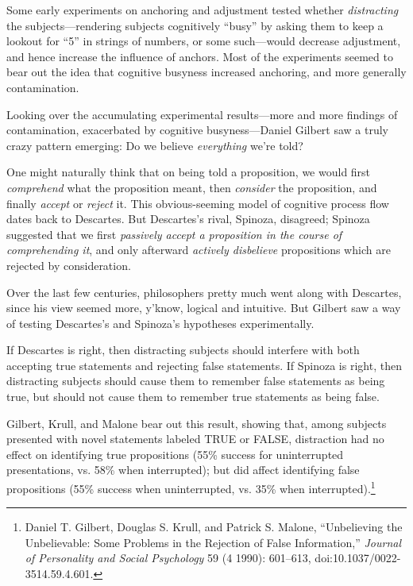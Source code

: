 \myendsectiontext


\bigskip


{
 Some early experiments on anchoring and adjustment tested whether
\textit{distracting} the subjects---rendering subjects cognitively
``busy'' by asking them to keep a
lookout for ``5'' in strings of
numbers, or some such---would decrease adjustment, and hence increase
the influence of anchors. Most of the experiments seemed to bear out
the idea that cognitive busyness increased anchoring, and more
generally contamination. }

{
 Looking over the accumulating experimental results---more and more
findings of contamination, exacerbated by cognitive busyness---Daniel
Gilbert saw a truly crazy pattern emerging: Do we believe
\textit{everything} we're told?}

{
 One might naturally think that on being told a proposition, we
would first \textit{comprehend} what the proposition meant, then
\textit{consider} the proposition, and finally \textit{accept} or
\textit{reject} it. This obvious-seeming model of cognitive process
flow dates back to Descartes. But Descartes's rival,
Spinoza, disagreed; Spinoza suggested that we first \textit{passively
accept a proposition in the course of comprehending it}, and only
afterward \textit{actively disbelieve} propositions which are rejected
by consideration.}

{
 Over the last few centuries, philosophers pretty much went along
with Descartes, since his view seemed more, y'know,
logical and intuitive. But Gilbert saw a way of testing
Descartes's and Spinoza's hypotheses
experimentally.}

{
 If Descartes is right, then distracting subjects should interfere
with both accepting true statements and rejecting false statements. If
Spinoza is right, then distracting subjects should cause them to
remember false statements as being true, but should not cause them to
remember true statements as being false.}

{
 Gilbert, Krull, and Malone bear out this result, showing that,
among subjects presented with novel statements labeled TRUE or FALSE,
distraction had no effect on identifying true propositions (55\%
success for uninterrupted presentations, vs. 58\% when interrupted);
but did affect identifying false propositions (55\% success when
uninterrupted, vs. 35\% when interrupted).\footnote{Daniel T. Gilbert, Douglas S. Krull, and Patrick S. Malone,
``Unbelieving the Unbelievable: Some Problems in the
Rejection of False Information,'' \textit{Journal of
Personality and Social Psychology} 59 (4 1990): 601--613,
doi:10.1037/0022-3514.59.4.601.}}

